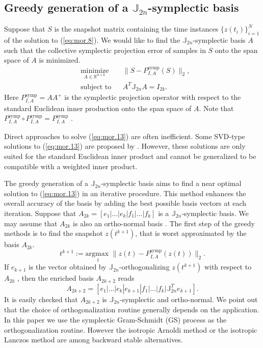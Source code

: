 \subsection{Greedy generation of a $\mathbb J_{2n}$-symplectic basis} \label{sec:mor.3}
Suppose that $S$ is the snapshot matrix containing the time instances $\{z(t_i)\}_{i=1}^N$ of the solution to (\ref{eq:mor.8}). We would like to find the $\mathbb J_{2n}$-symplectic basis $A$ such that the collective symplectic projection error of samples in $S$ onto the span space of $A$ is minimized.
\begin{equation} \label{eq:mor.13}
\begin{aligned}
& \underset{A\in \mathbb{R}^{n\times k}}{\text{minimize}}
& & \| S - P^\text{symp}_{I,A}(S) \|_2, \\
& \text{subject to}
& & A^T\mathbb J_{2n}A = I_{2k}.
\end{aligned}
\end{equation}
Here $P^\text{symp}_{I,A} = AA^+$ is the symplectic projection operator with respect to the standard Euclidean inner production onto the span space of $A$. Note that $P^\text{symp}_{I,A} \circ P^\text{symp}_{I,A} = P^\text{symp}_{I,A}$ \cite{doi:10.1137/140978922,doi:10.1137/17M1111991}.

Direct approaches to solve (\ref{eq:mor.13}) are often inefficient. Some SVD-type solutions to (\ref{eq:mor.13}) are proposed by \cite{doi:10.1137/140978922}. However, these solutions are only suited for the standard Euclidean inner product and cannot be generalized to be compatible with a weighted inner product. 


The greedy generation of a $\mathbb J_{2n}$-symplectic basis aims to find a near optimal solution to (\ref{eq:mor.13}) in an iterative procedure. This method enhances the overall accuracy of the basis by adding the best possible basis vectors at each iteration. Suppose that $A_{2k} = [e_1|\dots|e_k|f_1|\dots|f_k]$ is a $\mathbb J_{2n}$-symplectic basis. We may assume that $A_{2k}$ is also an ortho-normal basis \cite{doi:10.1137/17M1111991}. The first step of the greedy methods is to find the snapshot $z(t^{k+1})$, that is worst approximated by the basis $A_{2k}$.
\begin{equation} \label{eq:mor.14}
	t^{k+1} := \underset{t}{\text{argmax } }\| z(t) - P^\text{symp}_{I,A}(z(t)) \|_2. 
\end{equation}
If $e_{k+1}$ is the vector obtained by $\mathbb J_{2n}$-orthogonalizing $z(t^{k+1})$ with respect to $A_{2k}$ \cite{doi:10.1137/17M1111991}, then the enriched basis $A_{2k+2}$ reads
\begin{equation} \label{eq:mor.15}
	A_{2k+2} = [e_1|\dots|e_k|e_{k+1}|f_1|\dots|f_k|\mathbb{J}_{2n}^T e_{k+1}].	
\end{equation}
It is easily checked that $A_{2k+2}$ is $\mathbb J_{2n}$-symplectic and ortho-normal. We point out that the choice of orthogonalization routine generally depends on the application. In this paper we use the symplectic Gram-Schmidt (GS) process as the orthogonalization routine. However the isotropic Arnoldi method or the isotropic Lanczos method \cite{doi:10.1137/S1064827500366434} are among backward stable alternatives.

